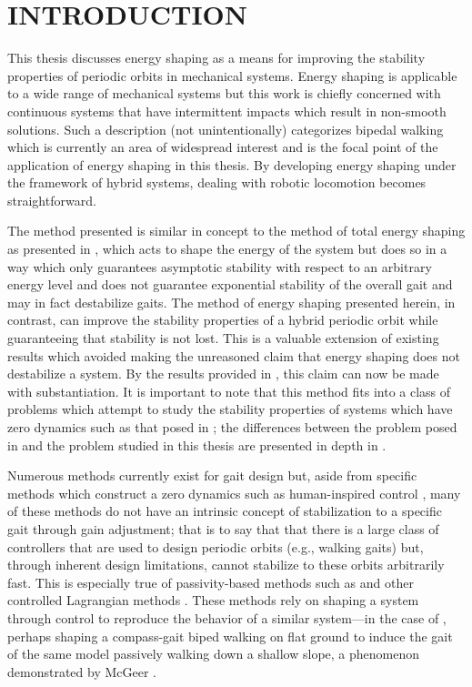 \chapter{\uppercase{Introduction}}

This thesis discusses energy shaping as a means for improving the stability
properties of periodic orbits in mechanical systems.
%
Energy shaping is applicable to a wide range of mechanical systems but this work
is chiefly concerned with continuous systems that have intermittent impacts
\cite{Brogliato1996} which result in non-smooth solutions.
%
Such a description (not unintentionally) categorizes bipedal walking which is
currently an area of widespread interest and is the focal point of the
application of energy shaping in this thesis.
%
By developing energy shaping under the framework of hybrid systems, dealing with
robotic locomotion becomes straightforward.
%

The method presented is similar in concept to the method of total energy shaping
as presented in \cite{Spong2007}, which acts to shape the energy of the system
but does so in a way which only guarantees asymptotic stability with respect to
an arbitrary energy level and does not guarantee exponential stability of the
overall gait and may in fact destabilize gaits.
%
The method of energy shaping presented herein, in contrast, can improve the
stability properties of a hybrid periodic orbit while guaranteeing that
stability is not lost.
%
This is a valuable extension of existing results which avoided making the
unreasoned claim that energy shaping does not destabilize a system.
%
By the results provided in , this claim can now be
made with substantiation.
%
It is important to note that this method fits into a class of problems which
attempt to study the stability properties of systems which have zero dynamics
such as that posed in \cite{Ames2014};
%
the differences between the problem posed in \cite{Ames2014} and the problem
studied in this thesis are presented in depth in .

Numerous methods currently exist for gait design but, aside from specific
methods which construct a zero dynamics such as human-inspired control
\cite{Grizzle2014}, many of these methods do not have an intrinsic concept of
stabilization to a specific gait through gain adjustment;
%
that is to say that that there is a large class of controllers that are used to
design periodic orbits (e.g., walking gaits) but, through inherent design
limitations, cannot stabilize to these orbits arbitrarily fast.
%
This is especially true of passivity-based methods such as \csx \cite{Spong2005}
and other controlled Lagrangian methods \cite{Bloch2001,Bloch2000}.
%
These methods rely on shaping a system through control to reproduce the behavior
of a similar system---in the case of \csx, perhaps shaping a compass-gait biped
walking on flat ground to induce the gait of the same model passively walking
down a shallow slope, a phenomenon demonstrated by McGeer \cite{McGeer1990}.

